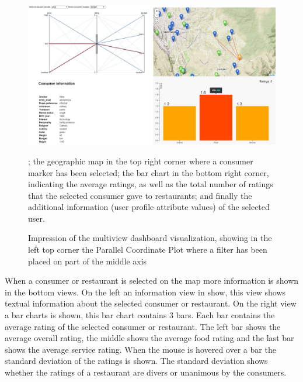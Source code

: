 \begin{figure}[h!]
 \centering
 \includegraphics[width=1\textwidth]{img/dashboard-final.jpg}
 \caption{Impression of the multiview dashboard visualization, showing in the left top corner the Parallel Coordinate Plot where a filter has been placed on part of the middle axis}; the geographic map in the top right corner where a consumer marker has been selected; the bar chart in the bottom right corner, indicating the average ratings, as well as the total number of ratings that the selected consumer gave to restaurants; and finally the additional information (user profile attribute values) of the selected user.
 \label{dashboard-view}
\end{figure}

When a consumer or restaurant is selected on the map more information is shown in the bottom views.
On the left an information view in show, this view shows textual information about the selected consumer or restaurant.
On the right view a bar charts is shown, this bar chart contains 3 bars.
Each bar contains the average rating of the selected consumer or restaurant.
The left bar shows the average overall rating, the middle shows the average food rating and the last bar shows the average service rating.
When the mouse is hovered over a bar the standard deviation of the ratings is shown.
The standard deviation shows whether the ratings of a restaurant are divers or unanimous by the consumers.






